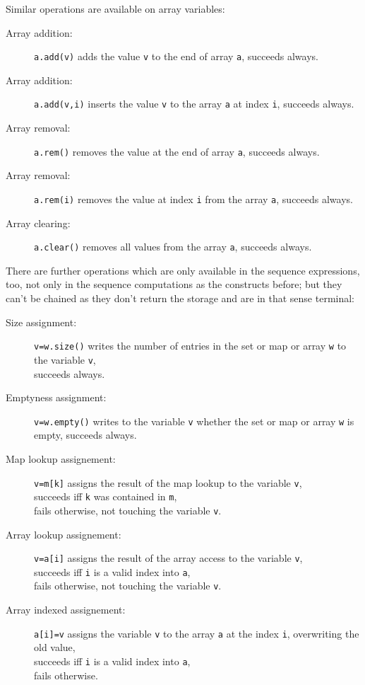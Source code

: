 \noindent Similar operations are available on array variables:

\begin{description}
\item[Array addition:] \texttt{a.add(v)} adds the value \texttt{v} to the end of array \texttt{a}, succeeds always.
\item[Array addition:] \texttt{a.add(v,i)} inserts the value \texttt{v} to the array \texttt{a} at index \texttt{i}, succeeds always.
\item[Array removal:] \texttt{a.rem()} removes the value at the end of array \texttt{a}, succeeds always.
\item[Array removal:] \texttt{a.rem(i)} removes the value at index \texttt{i} from the array \texttt{a}, succeeds always.
\item[Array clearing:] \texttt{a.clear()} removes all values from the array \texttt{a}, succeeds always.
\end{description}

\noindent There are further operations which are only available in the sequence expressions, too, not only in the sequence computations as the constructs before; but they can't be chained as they don't return the storage and are in that sense terminal:

\begin{description}
\item[Size assignment:] \texttt{v=w.size()} writes the number of entries in the set or map or array \texttt{w} to the variable \texttt{v},\\succeeds always.
\item[Emptyness assignment:] \texttt{v=w.empty()} writes to the variable \texttt{v} whether the set or map or array \texttt{w} is empty, succeeds always.
\item[Map lookup assignement:] \texttt{v=m[k]} assigns the result of the map lookup to the variable \texttt{v},\\succeeds iff \texttt{k} was contained in \texttt{m},\\ fails otherwise, not touching the variable \texttt{v}.
\item[Array lookup assignement:] \texttt{v=a[i]} assigns the result of the array access to the variable \texttt{v},\\succeeds iff \texttt{i} is a valid index into \texttt{a},\\ fails otherwise, not touching the variable \texttt{v}.
\item[Array indexed assignement:] \texttt{a[i]=v} assigns the variable \texttt{v} to the array \texttt{a} at the index \texttt{i}, overwriting the old value,\\succeeds iff \texttt{i} is a valid index into \texttt{a},\\ fails otherwise.
\end{description}

